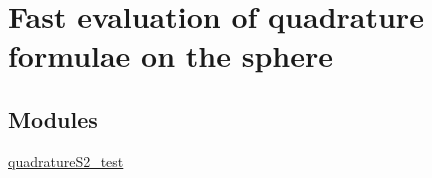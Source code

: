 \hypertarget{group__applications__quadratureS2}{
\section{Fast evaluation of quadrature formulae on the sphere}
\label{group__applications__quadratureS2}
}
\subsection*{Modules}
\begin{CompactItemize}
\item 
\hyperlink{group__applications__quadratureS2__test}{quadrature\-S2\_\-test}
\end{CompactItemize}
